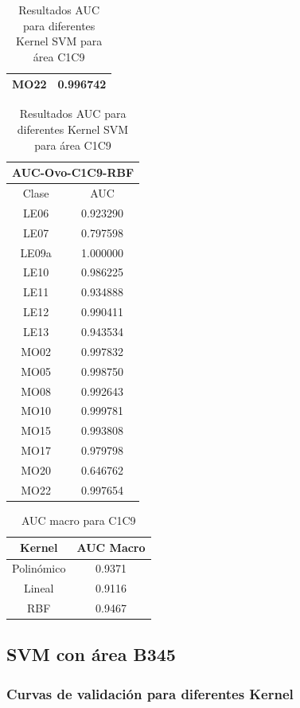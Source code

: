 \begin{table}[H]
{\begin{tabular}{|c|c|}
		MO22 & 0.996742 \\ \hline
	\end{tabular}
	\begin{tabular}{|c|c|}
		\hline
		\multicolumn{2}{|c|}{AUC-Ovo-C1C9-RBF} \\ \hline \hline
		Clase & AUC \\ \hline
		LE06 & 0.923290 \\ \hline
		LE07 & 0.797598 \\ \hline
		LE09a & 1.000000 \\ \hline
		LE10 & 0.986225 \\ \hline
		LE11 & 0.934888 \\ \hline
		LE12 & 0.990411 \\ \hline
		LE13 & 0.943534 \\ \hline
		MO02 & 0.997832 \\ \hline
		MO05 & 0.998750 \\ \hline
		MO08 & 0.992643 \\ \hline
		MO10 & 0.999781 \\ \hline
		MO15 & 0.993808 \\ \hline
		MO17 & 0.979798 \\ \hline
		MO20 & 0.646762 \\ \hline
		MO22 & 0.997654 \\ \hline
	\end{tabular}}
	\caption{Resultados AUC para diferentes Kernel SVM para área C1C9}
	\label{res:svc_c1c9}
\end{table}

\begin{table}[H]
	\centering
	\captionsetup{justification=centering}
	\begin{tabular}{|c|c|}
		\hline
		Kernel & AUC Macro \\ \hline \hline
		Polinómico & 0.9371 \\ \hline
		Lineal & 0.9116 \\ \hline
		RBF & 0.9467 \\ \hline
	\end{tabular}
	\caption{AUC macro para C1C9}
	\label{res:svc_auc_macro_c1c9}	
\end{table}

\subsection{SVM con área B345}

\subsubsection{Curvas de validación para diferentes Kernel}

